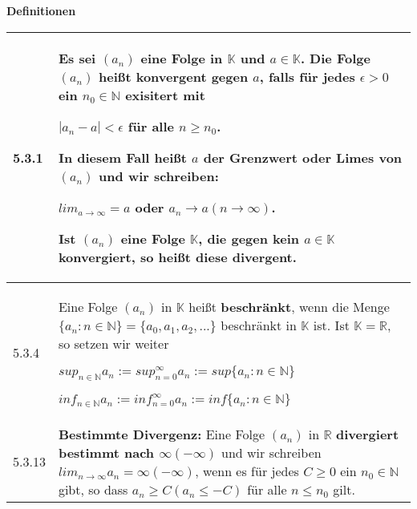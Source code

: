     \noindent
    \textbf{Definitionen}
    \begin{table}[H]  
    \begin{tabularx}{\textwidth}{X m{16cm}}
        \toprule
        
        5.3.1 & Es sei $(a_n)$ eine Folge in $\mathbb{K}$ und $a \in \mathbb{K}$. Die Folge $(a_n)$ heißt \textbf{konvergent} gegen $a$,
                falls für jedes $\epsilon > 0$ ein $n_0 \in \mathbb{N}$ exisitert mit \hfill \break
                \centerline{$|a_n-a| < \epsilon$ für alle $n \geq n_0$.}
                In diesem Fall heißt $a$ der \textbf{Grenzwert} oder Limes von $(a_n)$ und wir schreiben: \hfill \break
                \centerline{$lim_{a \rightarrow \infty} = a$ oder $a_n \rightarrow a (n \rightarrow \infty)$.} 
                Ist $(a_n)$ eine Folge $\mathbb{K}$, die gegen kein $a \in \mathbb{K}$ konvergiert, so heißt diese \textbf{divergent}. \\
        \midrule
        5.3.4 & Eine Folge $(a_n)$ in $\mathbb{K}$ heißt \textbf{beschränkt}, wenn die Menge $\{a_n: n \in \mathbb{N}\} = \{a_0,a_1,a_2,...\}$
                beschränkt in $\mathbb{K}$ ist. \hfill \break
                Ist $\mathbb{K} = \mathbb{R}$, so setzen wir weiter \hfill \break
                \centerline{$sup_{n \in \mathbb{N}}a_n := sup^{\infty}_{n=0}a_n := sup\{a_n: n \in \mathbb{N}\}$} 
                \centerline{$inf_{n \in \mathbb{N}}a_n := inf^{\infty}_{n=0}a_n := inf\{a_n: n \in \mathbb{N}\}$} \\
        \midrule
        5.3.13& \textbf{Bestimmte Divergenz:} \hfill \break
                Eine Folge $(a_n)$ in $\mathbb{R}$ \textbf{divergiert bestimmt nach $\infty (- \infty)$} und wir schreiben
                $lim_{n \rightarrow \infty} a_n = \infty (-\infty)$, wenn es für jedes $C \geq 0$ ein $n_0 \in \mathbb{N}$ gibt, so dass
                $a_n \geq C (a_n \leq -C)$ für alle $n \leq n_0$ gilt. \\


        \bottomrule
        
    \end{tabularx}
    \end{table}

